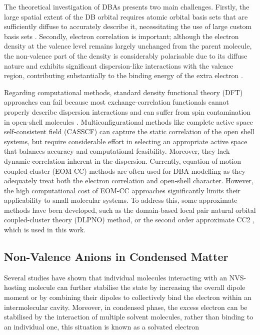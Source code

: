 The theoretical investigation of DBAs presents two main challenges. Firstly, the large spatial extent of the DB orbital requires atomic orbital basis sets that are sufficiently diffuse to accurately describe it, necessitating the use of large custom basis sets \cite{skurski2000choose}. Secondly, electron correlation is important; although the electron density at the valence level remains largely unchanged from the parent molecule, the non-valence part of the density is considerably polarisable due to its diffuse nature and exhibits significant dispersion-like interactions with the valence region, contributing substantially to the binding energy of the extra electron \cite{simons2008molecular,simons2011theoretical,simons2023molecular,gutowski1996contribution,voora2017theoretical}.

Regarding computational methods, standard density functional theory (DFT) approaches can fail because most exchange-correlation functionals cannot properly describe dispersion interactions and can suffer from spin contamination in open-shell molecules \cite{thiam2023accurately}. Multiconfigurational methods like complete active space self-consistent field (CASSCF)\cite{vila2002theoretical,ivanov2015anion} can capture the static correlation of the open shell systems, but require considerable effort in selecting an appropriate active space that balances accuracy and computational feasibility. Moreover, they lack dynamic correlation inherent in the dispersion. Currently, equation-of-motion coupled-cluster (EOM-CC)\cite{herbert2015quantum,jordan2003theory,moorby2024signatures} methods are often used for DBA modelling as they adequately treat both the electron correlation and open-shell character. However, the high computational cost of EOM-CC approaches significantly limits their applicability to small molecular systems. To address this, some approximate methods have been developed, such as the domain-based local pair natural orbital coupled-cluster theory (DLPNO) method\cite{haldar2020multilayer,schulz2018systematic}, or the second order approximate CC2 \cite{christiansen1995second,paran2024performance}, which is used in this work.

\subsection{Non-Valence Anions in Condensed Matter}

Several studies have shown that individual molecules interacting with an NVS-hosting molecule can further stabilise the state by increasing the overall dipole moment or by combining their dipoles to collectively bind the electron within an intermolecular cavity. Moreover, in condensed phase, the excess electron can be stabilised by the interaction of multiple solvent molecules, rather than binding to an individual one, this situation is known as a solvated electron \cite{schiedt1998anion,gutowski2002solvated,jordan2003theory,eustis2007photoelectron,simons2008molecular,herbert2015quantum,clarke2025role}

